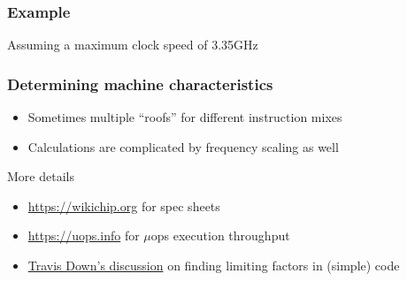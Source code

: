 \documentclass[dvipsnames,presentation,aspectratio=169,14pt]{beamer}
\begin{document}
\begin{frame}
  \frametitle{Example}
  Assuming a maximum clock speed of 3.35GHz

  \vskip 11pt

\end{frame}

\begin{frame}
  \frametitle{Determining machine characteristics}
  \begin{itemize}[itemsep=8pt]
  \item Sometimes  multiple ``roofs'' for  different instruction mixes
  \item Calculations are complicated by frequency scaling as well
  \end{itemize}

  \vskip 5pt

  \begin{answer}{More details}
    \begin{itemize}[itemsep=5pt]
    \item \url{https://wikichip.org} for spec sheets
    \item \url{https://uops.info} for $\mu$ops execution throughput
    \item \href{https://travisdowns.github.io/blog/2019/06/11/speed-limits.html}
      {Travis Down's discussion} on finding limiting factors in (simple)
      code
    \end{itemize}
  \end{answer}
\end{frame}
\end{document}
